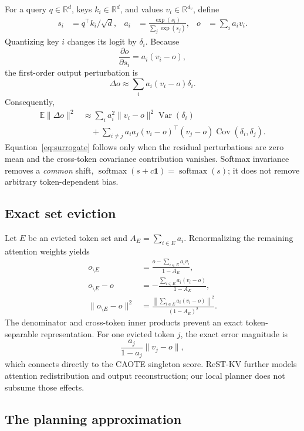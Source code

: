 For a query $q\in\mathbb R^d$, keys $k_i\in\mathbb R^d$, and values
$v_i\in\mathbb R^{d_v}$, define
\begin{align}
 s_i &= q^\top k_i/\sqrt d, &
 a_i &= \frac{\exp(s_i)}{\sum_j\exp(s_j)}, &
 o &= \sum_i a_i v_i .
\end{align}
Quantizing key $i$ changes its logit by $\delta_i$.  Because
\[
 \frac{\partial o}{\partial s_i}=a_i(v_i-o),
\]
the first-order output perturbation is
\begin{equation}
 \Delta o \approx \sum_i a_i(v_i-o)\delta_i .
 \label{eq:app-linear}
\end{equation}
Consequently,
\begin{align}
 \mathbb E\|\Delta o\|^2
 &\approx
 \sum_i a_i^2\|v_i-o\|^2\operatorname{Var}(\delta_i)
 \nonumber\\
 &\quad+
 \sum_{i\ne j}a_i a_j
 (v_i-o)^\top(v_j-o)\operatorname{Cov}(\delta_i,\delta_j).
 \label{eq:app-covariance}
\end{align}
Equation~\eqref{eq:surrogate} follows only when the residual perturbations are
zero mean and the cross-token covariance contribution vanishes.  Softmax
invariance removes a \emph{common} shift,
$\operatorname{softmax}(s+c\mathbf 1)=\operatorname{softmax}(s)$; it does not
remove arbitrary token-dependent bias.

\subsection{Exact set eviction}

Let $E$ be an evicted token set and $A_E=\sum_{i\in E}a_i$.  Renormalizing the
remaining attention weights yields
\begin{align}
 o_{\setminus E}
 &=\frac{o-\sum_{i\in E}a_i v_i}{1-A_E},\\
 o_{\setminus E}-o
 &=-\frac{\sum_{i\in E}a_i(v_i-o)}{1-A_E},\\
 \|o_{\setminus E}-o\|^2
 &=\frac{\left\|\sum_{i\in E}a_i(v_i-o)\right\|^2}
 {(1-A_E)^2}.
 \label{eq:app-exact-eviction}
\end{align}
The denominator and cross-token inner products prevent an exact token-separable
representation.  For one evicted token $j$, the exact error magnitude is
\[
 \frac{a_j}{1-a_j}\|v_j-o\|,
\]
which connects directly to the CAOTE singleton score.  ReST-KV further models
attention redistribution and output reconstruction; our local planner does not
subsume those effects.

\subsection{The planning approximation}

